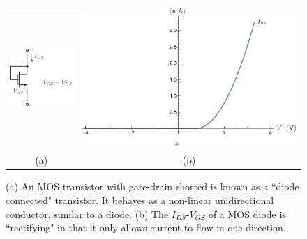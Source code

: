 \begin{figure}[tb]
\begin{center}
\begin{tabular}{cc}
\includegraphics[scale=1]{3mos_diode.pdf} &
\includegraphics[width=.5\columnwidth]{ivrect.pdf} \\
(a) & (b) \\
\end{tabular}
\end{center}
\caption{(a) An MOS transistor with gate-drain shorted is known as a ``diode connected" transistor.  It behaves as a non-linear unidirectional conductor, similar to a diode.  (b) The $I_{DS}$-$V_{GS}$ of a MOS diode is ``rectifying" in that it only allows current to flow in one direction.} \label{fig:3mos_diode.pdf}
\end{figure}

